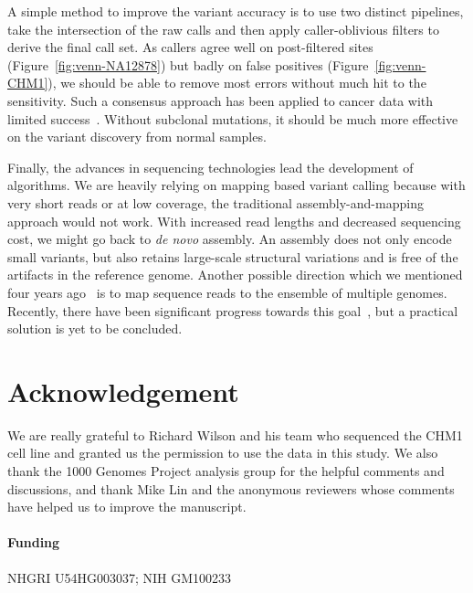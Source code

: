 \documentclass{bioinfo}
\begin{document}
A simple method to improve the variant accuracy is to use two distinct pipelines,
take the intersection of the raw calls and then apply caller-oblivious filters
to derive the final call set. As callers agree well on post-filtered sites
(Figure~\ref{fig:venn-NA12878}) but badly on false positives
(Figure~\ref{fig:venn-CHM1}), we should be able to remove most errors without
much hit to the sensitivity. Such a consensus approach has been applied to
cancer data with limited success~\citep{Lower:2012aa,Goode:2013aa}. Without
subclonal mutations, it should be much more effective on the variant discovery
from normal samples.

Finally, the advances in sequencing technologies lead the development of
algorithms. We are heavily relying on mapping based variant calling because
with very short reads or at low coverage, the traditional
assembly-and-mapping approach would not work. With increased read
lengths and decreased sequencing cost, we might go back to \emph{de novo}
assembly. An assembly does not only encode small variants, but also
retains large-scale structural variations and is free of the artifacts in the
reference genome. Another possible direction which we mentioned four years
ago~\citep{Li:2010kx} is to map sequence reads to the ensemble of 
multiple genomes. Recently, there have been significant progress towards this
goal~\citep{DBLP:journals/corr/abs-1010-2656,Paten:2014aa}, but a practical solution is yet to
be concluded.

\section*{Acknowledgement}
We are really grateful to Richard Wilson and his team who sequenced the CHM1 cell line
and granted us the permission to use the data in this study. We also thank the
1000 Genomes Project analysis group for the helpful comments and discussions,
and thank Mike Lin and the anonymous reviewers whose comments have helped us to
improve the manuscript.

\paragraph{Funding\textcolon} NHGRI U54HG003037; NIH GM100233


\end{document}
